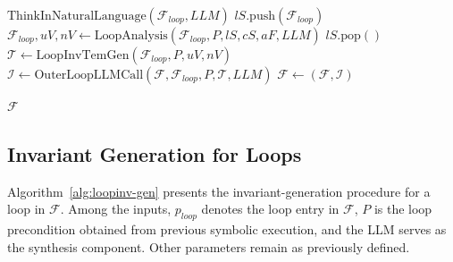 
\begin{algorithm}[htbp]
\caption{Loop Invariant Generation $\mathrm{LoopInvGen}$}
\label{alg:loopinv-gen}
\small
{}

$\mathrm{ThinkInNaturalLanguage}(\mathcal{F}_{\textit{loop}},\textit{LLM})$\;
$\textit{lS}.\mathrm{push}(\mathcal{F}_{\textit{loop}})$\;
$\mathcal{F}_{\textit{loop}}, \textit{uV}, \textit{nV} \gets \mathrm{LoopAnalysis}(\mathcal{F}_{\textit{loop}},P,\textit{lS},\textit{cS},\textit{aF},\textit{LLM})$\;
$\textit{lS}.\mathrm{pop}()$
$\mathcal{T} \gets \mathrm{LoopInvTemGen}(\mathcal{F}_{\textit{loop}},P,\textit{uV},\textit{nV})$\;
$\mathcal{I} \gets \mathrm{OuterLoopLLMCall}(\mathcal{F},\mathcal{F}_{\textit{loop}},P,\mathcal{T},\textit{LLM})$\;
$\mathcal{F} \gets (\mathcal{F},\mathcal{I})$\;


\Return $\mathcal{F}$\;
\end{algorithm}

\subsection{Invariant Generation for Loops}
Algorithm~\ref{alg:loopinv-gen} presents the invariant-generation procedure for a loop in $\mathcal{F}$. Among the inputs, $p_{\textit{loop}}$ denotes the loop entry in $\mathcal{F}$, $P$ is the loop precondition obtained from previous symbolic execution, and the LLM serves as the synthesis component. Other parameters remain as previously defined.

